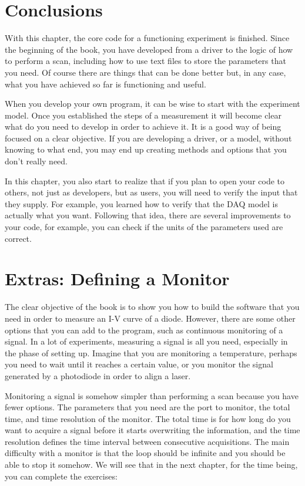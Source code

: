 \section{Conclusions}\label{conclusions}
With this chapter, the core code for a functioning experiment is
finished. Since the beginning of the book, you have developed from a
driver to the logic of how to perform a scan, including how to use text
files to store the parameters that you need. Of course there are things
that can be done better but, in any case, what you have achieved so far
is functioning and useful.

When you develop your own program, it can be wise to start with the
experiment model. Once you established the steps of a measurement it
will become clear what do you need to develop in order to achieve it. It
is a good way of being focused on a clear objective. If you are
developing a driver, or a model, without knowing to what end, you may
end up creating methods and options that you don't really need.

In this chapter, you also start to realize that if you plan to open your
code to others, not just as developers, but as users, you will need to
verify the input that they supply. For example, you learned how to
verify that the {DAQ} model is actually what you want. Following that
idea, there are several improvements to your code, for example, you can
check if the units of the parameters used are correct.

\section{Extras: Defining a Monitor}\label{extras-defining-amonitor}
The clear objective of the book is to show you how to build the software
that you need in order to measure an I-V curve of a diode. However,
there are some other options that you can add to the program, such as
continuous monitoring of a signal. In a lot of experiments, measuring a
signal is all you need, especially in the phase of setting up. Imagine
that you are monitoring a temperature, perhaps you need to wait until it
reaches a certain value, or you monitor the signal generated by a
photodiode in order to align a laser.

Monitoring a signal is somehow simpler than performing a scan because
you have fewer options. The parameters that you need are the port to
monitor, the total time, and time resolution of the monitor. The total
time is for how long do you want to acquire a signal before it starts
overwriting the information, and the time resolution defines the time
interval between consecutive acquisitions. The main difficulty with a
monitor is that the loop should be infinite and you should be able to
stop it somehow. We will see that in the next chapter, for the time
being, you can complete the exercises:

